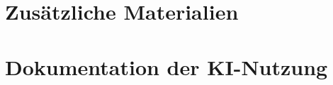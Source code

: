 \appendix


\section{Zusätzliche Materialien}
\label{app:materialien}


\clearpage

\section{Dokumentation der KI-Nutzung}
\label{app:ki}

